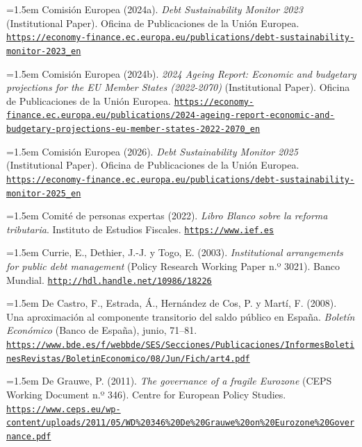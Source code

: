 \documentclass[10pt,a4paper]{article}
\begin{document}
\noindent\hangindent=1.5em Comisión Europea (2024a). \textit{Debt Sustainability Monitor 2023} (Institutional Paper). Oficina de Publicaciones de la Unión Europea. \href{https://economy-finance.ec.europa.eu/publications/debt-sustainability-monitor-2023_en}{\nolinkurl{https://economy-finance.ec.europa.eu/publications/debt-sustainability-monitor-2023_en}}

\noindent\hangindent=1.5em Comisión Europea (2024b). \textit{2024 Ageing Report: Economic and budgetary projections for the EU Member States (2022-2070)} (Institutional Paper). Oficina de Publicaciones de la Unión Europea. \href{https://economy-finance.ec.europa.eu/publications/2024-ageing-report-economic-and-budgetary-projections-eu-member-states-2022-2070_en}{\nolinkurl{https://economy-finance.ec.europa.eu/publications/2024-ageing-report-economic-and-budgetary-projections-eu-member-states-2022-2070_en}}

\noindent\hangindent=1.5em Comisión Europea (2026). \textit{Debt Sustainability Monitor 2025} (Institutional Paper). Oficina de Publicaciones de la Unión Europea. \href{https://economy-finance.ec.europa.eu/publications/debt-sustainability-monitor-2025_en}{\nolinkurl{https://economy-finance.ec.europa.eu/publications/debt-sustainability-monitor-2025_en}}

\noindent\hangindent=1.5em Comité de personas expertas (2022). \textit{Libro Blanco sobre la reforma tributaria}. Instituto de Estudios Fiscales. \href{https://www.ief.es}{\nolinkurl{https://www.ief.es}}

\noindent\hangindent=1.5em Currie, E., Dethier, J.-J. y Togo, E. (2003). \textit{Institutional arrangements for public debt management} (Policy Research Working Paper n.º 3021). Banco Mundial. \href{http://hdl.handle.net/10986/18226}{\nolinkurl{http://hdl.handle.net/10986/18226}}

\noindent\hangindent=1.5em De Castro, F., Estrada, Á., Hernández de Cos, P. y Martí, F. (2008). Una aproximación al componente transitorio del saldo público en España. \textit{Boletín Económico} (Banco de España), junio, 71--81. \href{https://www.bde.es/f/webbde/SES/Secciones/Publicaciones/InformesBoletinesRevistas/BoletinEconomico/08/Jun/Fich/art4.pdf}{\nolinkurl{https://www.bde.es/f/webbde/SES/Secciones/Publicaciones/InformesBoletinesRevistas/BoletinEconomico/08/Jun/Fich/art4.pdf}}

\noindent\hangindent=1.5em De Grauwe, P. (2011). \textit{The governance of a fragile Eurozone} (CEPS Working Document n.º 346). Centre for European Policy Studies. \href{https://www.ceps.eu/wp-content/uploads/2011/05/WD\%20346\%20De\%20Grauwe\%20on\%20Eurozone\%20Governance.pdf}{\nolinkurl{https://www.ceps.eu/wp-content/uploads/2011/05/WD\%20346\%20De\%20Grauwe\%20on\%20Eurozone\%20Governance.pdf}}
\end{document}
